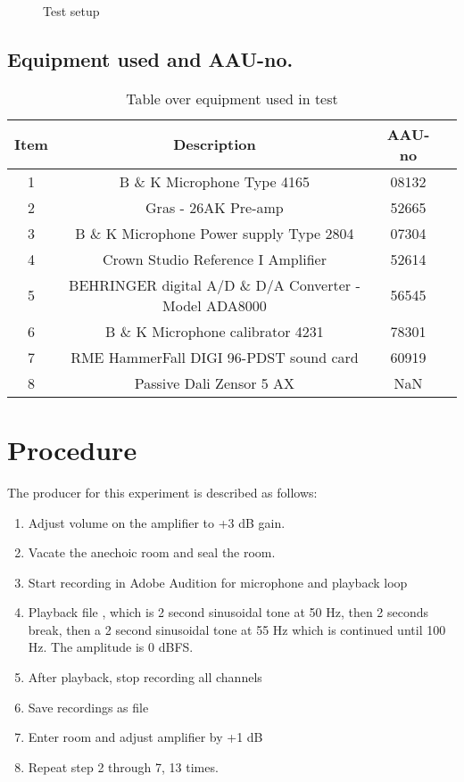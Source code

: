 \begin{figure}[H]
\centering
{}
\scalebox{0.7}{

}
\caption{Test setup}
\label{figure:SpeakertestSetup3}
\end{figure}

\subsection*{Equipment used and AAU-no.}

\begin{table}[H]
\centering
{}
\begin{tabular}{S[table-format=1]ccc} \toprule
    {Item} & {Description} & {AAU-no} \\       &  B \& K Microphone Type 4165  & 08132   \\
    2      &  Gras - 26AK Pre-amp & 52665   \\
    3      &  B \& K Microphone Power supply Type 2804  & 07304   \\
    4      &  Crown Studio Reference I Amplifier & 52614   \\
    5      &  BEHRINGER digital A/D \& D/A Converter - Model ADA8000   & 56545   \\
    6     &  B \& K Microphone calibrator 4231 & 78301   \\
    7     &  RME HammerFall DIGI 96-PDST sound card & 60919  \\
    8     &  Passive Dali Zensor 5 AX & NaN  \\ \bottomrule 
\end{tabular}
\caption{Table over equipment used in test}
\label{tab:UsedEquipment3}
\end{table}



\section{Procedure}\label{sec:SpeakerTestProcedure3}

The producer for this experiment is described as follows:
\vspace*{-5mm}
\begin{enumerate}\addtolength{\itemsep}{-.35\baselineskip} 
\item Adjust volume on the amplifier to +3 dB gain.
\item Vacate the anechoic room and seal the room.
\item Start recording in Adobe Audition for microphone and playback loop
\item Playback file , which is 2 second sinusoidal tone at 50 Hz, then 2 seconds break, then a 2 second sinusoidal tone at 55 Hz which is continued until 100 Hz. The amplitude is 0 dBFS.
\item After playback, stop recording all channels
\item Save recordings as  file
\item Enter room and adjust amplifier by +1 dB
\item Repeat step 2 through 7, 13 times.
\end{enumerate}

